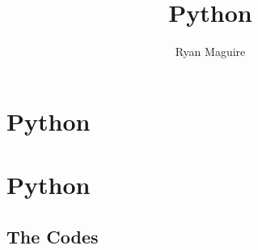 \documentclass[crop=false,class=book,oneside]{standalone}
\begin{document}
    \ifx\ifplanetdiff\undefined
        \title{Python}
        \author{Ryan Maguire}
        \date{\vspace{-5ex}}
        \maketitle
        \tableofcontents
        \clearpage
        \setcounter{chapter}{5}
        \chapter{Python}
    \else
        \chapter{Python}
    \fi
    \section{The Codes}
\end{document}
